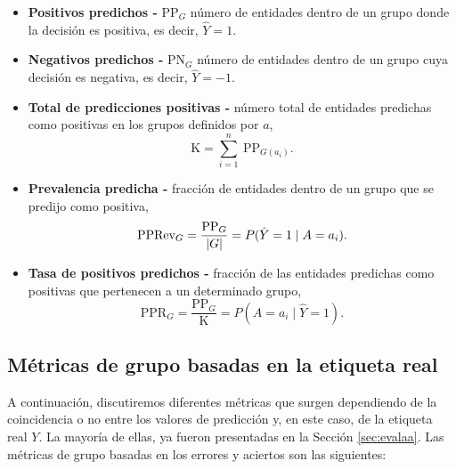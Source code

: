 \documentclass[oneside,openright,titlepage,numbers=noenddot,openany,headinclude,footinclude=true,
cleardoublepage=empty,abstractoff,BCOR=5mm,paper=a4,fontsize=12pt,main=spanish]{scrreprt}
\begin{document}
\begin{itemize}
    \item \textbf{Positivos predichos -} PP$_G$ número de entidades dentro de un grupo donde la decisión es positiva, es decir, $\hat{Y} = 1$.
    \item \textbf{Negativos predichos -} PN$_G$ número de entidades dentro de un grupo cuya decisión es negativa, es decir, $\hat{Y} = -1$.
    \item \textbf{Total de predicciones positivas -} número total de entidades predichas como positivas en los grupos definidos por $a$, $$\text{K} = \sum_{i=1}^{n} \  \text{PP}_{G(a_i)}.$$
    \item \textbf{Prevalencia predicha -} fracción de entidades dentro de un grupo que se predijo como positiva, $$\text{PPRev}_G = \frac{\text{PP}_G}{\left\lvert G\right\rvert} = P(\hat{Y}=1 \mid A=a_i).$$
    \item \textbf{Tasa de positivos predichos -} fracción de las entidades predichas como positivas que pertenecen a un determinado grupo, $$\text{PPR}_G = \frac{\text{PP}_G}{\text{K}} = P(A=a_i \mid \hat{Y}=1).$$
\end{itemize}

\subsection*{Métricas de grupo basadas en la etiqueta real}

A continuación, discutiremos diferentes métricas que surgen dependiendo de la coincidencia o no entre los valores de predicción y, en este caso, de la etiqueta real $Y$. La mayoría de ellas, ya fueron presentadas en la Sección \ref{sec:evalaa}. Las métricas de grupo basadas en los errores y aciertos son las siguientes:
\end{document}
